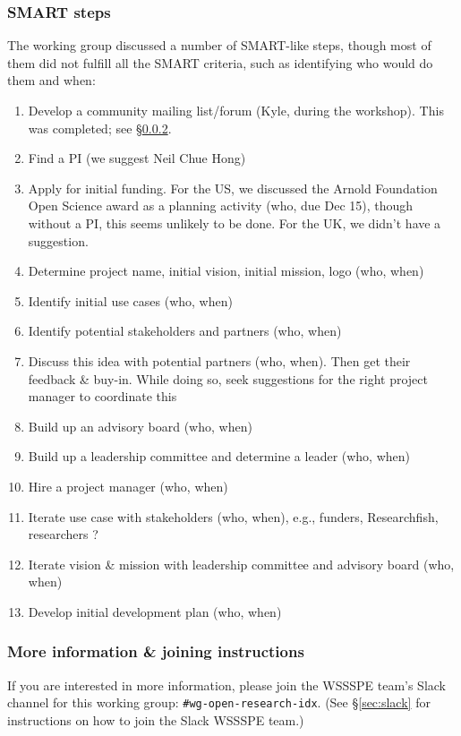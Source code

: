 \subsubsection{SMART steps}

The working group discussed a number of SMART-like steps, though most of them did not fulfill all the SMART criteria, such as identifying who would do them and when:

\begin{enumerate}
\item Develop a community mailing list/forum (Kyle, during the workshop).  This was completed; see \S\ref{sec:wg-open-research-index-list}.

\item Find a PI (we suggest Neil Chue Hong)

\item Apply for initial funding. For the US, we discussed the Arnold Foundation Open Science award as a planning activity (who, due Dec 15), though without a PI, this seems unlikely to be done.
For the UK, we didn't have a suggestion.

\item Determine project name, initial vision, initial mission, logo (who, when)

\item Identify initial use cases (who, when)

\item Identify potential stakeholders and partners (who, when)

\item Discuss this idea with potential partners (who, when).
Then get their feedback \& buy-in.
While doing so, seek suggestions for the right project manager to coordinate this

\item Build up an advisory board (who, when)

\item Build up a leadership committee and determine a leader (who, when)

\item Hire a project manager (who, when)

\item Iterate use case with stakeholders (who, when),
e.g., funders, Researchfish, researchers ?

\item Iterate vision \& mission with leadership committee and advisory board (who, when)

\item Develop initial development plan (who, when)

\end{enumerate}


\subsubsection{More information \& joining instructions}\label{sec:wg-open-research-index-list}

If you are interested in more information, please join the WSSSPE team's Slack channel for this working group: \texttt{\#wg-open-research-idx}. (See \S\ref{sec:slack} for instructions on how to join the Slack WSSSPE team.)
